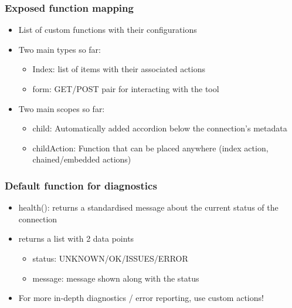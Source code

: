 \begin{frame}
	\frametitle{Exposed function mapping}
	\begin{itemize}
                \item List of custom functions with their configurations
                \item Two main types so far:
        	\begin{itemize}
	                \item Index: list of items with their associated actions
	                \item form: GET/POST pair for interacting with the tool
        	\end{itemize}
                \item Two main scopes so far:
        	\begin{itemize}
	                \item child: Automatically added accordion below the connection's metadata
	                \item childAction: Function that can be placed anywhere (index action, chained/embedded actions)
        	\end{itemize}
	\end{itemize}
\end{frame}

\begin{frame}
	\frametitle{Default function for diagnostics}
	\begin{itemize}
		\item health(): returns a standardised message about the current status of the connection
		\item returns a list with 2 data points
		\begin{itemize}
			\item status: UNKNOWN/OK/ISSUES/ERROR
                        \item message: message shown along with the status
		\end{itemize}
		\item For more in-depth diagnostics / error reporting, use custom actions!
	\end{itemize}
\end{frame}



